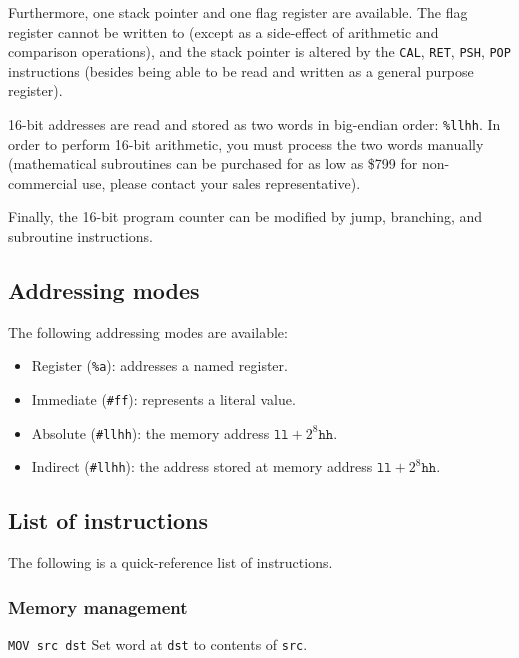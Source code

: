 \documentclass[a5paper,onecolumn,final,10pt]{memoir}
\begin{document}
Furthermore, one stack pointer and one flag register are available.
The flag register cannot be written to (except as a side-effect of arithmetic and comparison operations),
and the stack pointer is altered by the \texttt{CAL}, \texttt{RET}, \texttt{PSH}, \texttt{POP} instructions
(besides being able to be read and written as a general purpose register).

16-bit addresses are read and stored as two words in big-endian order: \texttt{\%llhh}.
In order to perform 16-bit arithmetic, you must process the two words manually
(mathematical subroutines can be purchased for as low as \$799 for non-commercial use, please contact your sales representative).

Finally, the 16-bit program counter can be modified by jump, branching, and subroutine instructions.

\subsection*{Addressing modes}

The following addressing modes are available:

\begin{itemize}[nosep]
	\item Register (\texttt{\%a}): addresses a named register.
	\item Immediate (\texttt{\#ff}): represents a literal value.
	\item Absolute (\texttt{\#llhh}): the memory address $\texttt{ll}+2^8\texttt{hh}$.
	\item Indirect (\texttt{\#llhh}): the address stored at memory address $\texttt{ll}+2^8\texttt{hh}$.
\end{itemize}

\subsection*{List of instructions}

The following is a quick-reference list of instructions.

\subsubsection*{Memory management}

\noindent\texttt{MOV src dst} \quad Set word at \texttt{dst} to contents of \texttt{src}.
\end{document}
